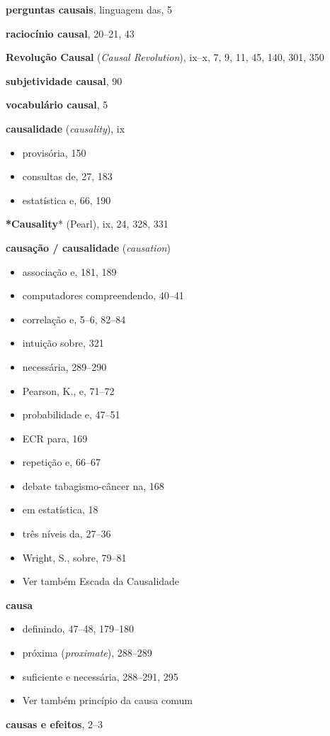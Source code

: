 \documentclass[11pt,a5paper,twoside]{book}
\begin{document}
\textbf{perguntas causais}, linguagem das, 5

\textbf{raciocínio causal}, 20–21, 43

\textbf{Revolução Causal} (\textit{Causal Revolution}), ix–x, 7, 9, 11, 45, 140, 301, 350

\textbf{subjetividade causal}, 90

\textbf{vocabulário causal}, 5

\textbf{causalidade} (\textit{causality}), ix

\begin{itemize}
\item provisória, 150
\item consultas de, 27, 183
\item estatística e, 66, 190
\end{itemize}
\textbf{*Causality}* (Pearl), ix, 24, 328, 331

\textbf{causação / causalidade} (\textit{causation})

\begin{itemize}
\item associação e, 181, 189
\item computadores compreendendo, 40–41
\item correlação e, 5–6, 82–84
\item intuição sobre, 321
\item necessária, 289–290
\item Pearson, K., e, 71–72
\item probabilidade e, 47–51
\item ECR para, 169
\item repetição e, 66–67
\item debate tabagismo-câncer na, 168
\item em estatística, 18
\item três níveis da, 27–36
\item Wright, S., sobre, 79–81
\item Ver também Escada da Causalidade
\end{itemize}
\textbf{causa}

\begin{itemize}
\item definindo, 47–48, 179–180
\item próxima (\textit{proximate}), 288–289
\item suficiente e necessária, 288–291, 295
\item Ver também princípio da causa comum
\end{itemize}
\textbf{causas e efeitos}, 2–3
\end{document}
